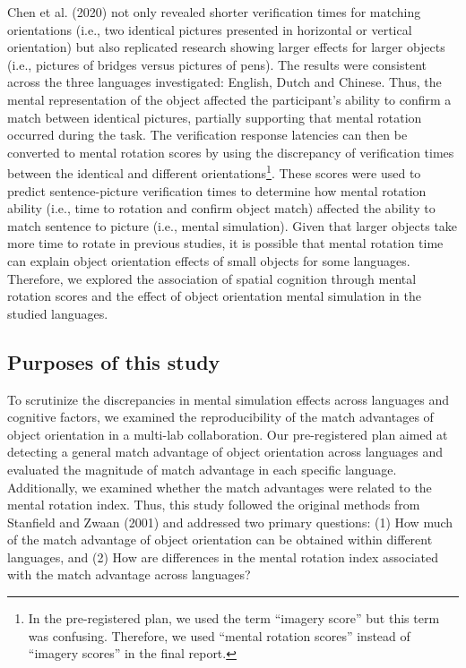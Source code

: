 \documentclass[
  man,mask,floatsintext]{apa7}
\begin{document}
Chen et al. (2020) not only revealed shorter verification times for
matching orientations (i.e., two identical pictures presented in
horizontal or vertical orientation) but also replicated research showing
larger effects for larger objects (i.e., pictures of bridges versus
pictures of pens). The results were consistent across the three
languages investigated: English, Dutch and Chinese. Thus, the mental
representation of the object affected the participant's ability to
confirm a match between identical pictures, partially supporting that
mental rotation occurred during the task. The verification response
latencies can then be converted to mental rotation scores by using the
discrepancy of verification times between the identical and different
orientations\footnote{In the pre-registered plan, we used the term ``imagery score'' but
  this term was confusing. Therefore, we used ``mental rotation scores''
  instead of ``imagery scores'' in the final report.}. These scores were used to predict sentence-picture
verification times to determine how mental rotation ability (i.e., time
to rotation and confirm object match) affected the ability to match
sentence to picture (i.e., mental simulation). Given that larger objects
take more time to rotate in previous studies, it is possible that mental
rotation time can explain object orientation effects of small objects
for some languages. Therefore, we explored the association of spatial
cognition through mental rotation scores and the effect of object
orientation mental simulation in the studied languages.

\hypertarget{purposes-of-this-study}{%
\subsection{Purposes of this study}\label{purposes-of-this-study}}

To scrutinize the discrepancies in mental simulation effects across
languages and cognitive factors, we examined the reproducibility of the
match advantages of object orientation in a multi-lab collaboration. Our
pre-registered plan aimed at detecting a general match advantage of
object orientation across languages and evaluated the magnitude of match
advantage in each specific language. Additionally, we examined whether
the match advantages were related to the mental rotation index. Thus,
this study followed the original methods from Stanfield and Zwaan (2001) and
addressed two primary questions: (1) How much of the match advantage of
object orientation can be obtained within different languages, and (2)
How are differences in the mental rotation index associated with the
match advantage across languages?
\end{document}
